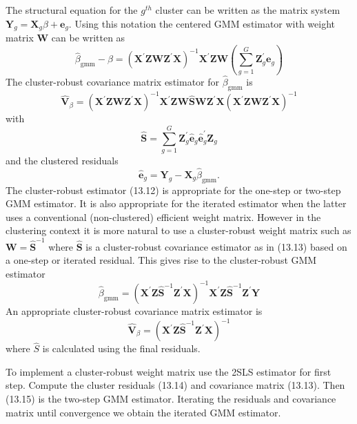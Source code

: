\documentclass[10pt]{article}
\begin{document}
The structural equation for the $g^{t h}$ cluster can be written as the matrix system $\boldsymbol{Y}_{g}=\boldsymbol{X}_{g} \beta+\boldsymbol{e}_{g}$. Using this notation the centered GMM estimator with weight matrix $\boldsymbol{W}$ can be written as
$$
\widehat{\beta}_{\mathrm{gmm}}-\beta=\left(\boldsymbol{X}^{\prime} \boldsymbol{Z} \boldsymbol{W} \boldsymbol{Z}^{\prime} \boldsymbol{X}\right)^{-1} \boldsymbol{X}^{\prime} \boldsymbol{Z} \boldsymbol{W}\left(\sum_{g=1}^{G} \boldsymbol{Z}_{g}^{\prime} \boldsymbol{e}_{g}\right)
$$
The cluster-robust covariance matrix estimator for $\widehat{\beta}_{\mathrm{gmm}}$ is
$$
\widehat{\boldsymbol{V}}_{\beta}=\left(\boldsymbol{X}^{\prime} \boldsymbol{Z} \boldsymbol{W} \boldsymbol{Z}^{\prime} \boldsymbol{X}\right)^{-1} \boldsymbol{X}^{\prime} \boldsymbol{Z} \boldsymbol{W} \widehat{\boldsymbol{S}} \boldsymbol{W} \boldsymbol{Z}^{\prime} \boldsymbol{X}\left(\boldsymbol{X}^{\prime} \boldsymbol{Z} \boldsymbol{W} \boldsymbol{Z}^{\prime} \boldsymbol{X}\right)^{-1}
$$
with
$$
\widehat{\boldsymbol{S}}=\sum_{g=1}^{G} \boldsymbol{Z}_{g}^{\prime} \widehat{\boldsymbol{e}}_{g} \widehat{\boldsymbol{e}}_{g}^{\prime} \boldsymbol{Z}_{g}
$$
and the clustered residuals
$$
\widehat{\boldsymbol{e}}_{g}=\boldsymbol{Y}_{g}-\boldsymbol{X}_{g} \widehat{\beta}_{\mathrm{gmm}} .
$$
The cluster-robust estimator (13.12) is appropriate for the one-step or two-step GMM estimator. It is also appropriate for the iterated estimator when the latter uses a conventional (non-clustered) efficient weight matrix. However in the clustering context it is more natural to use a cluster-robust weight matrix such as $\boldsymbol{W}=\widehat{\boldsymbol{S}}^{-1}$ where $\widehat{\boldsymbol{S}}$ is a cluster-robust covariance estimator as in (13.13) based on a one-step or iterated residual. This gives rise to the cluster-robust GMM estimator
$$
\widehat{\beta}_{\mathrm{gmm}}=\left(\boldsymbol{X}^{\prime} \boldsymbol{Z} \widehat{\boldsymbol{S}}^{-1} \boldsymbol{Z}^{\prime} \boldsymbol{X}\right)^{-1} \boldsymbol{X}^{\prime} \boldsymbol{Z} \widehat{\boldsymbol{S}}^{-1} \boldsymbol{Z}^{\prime} \boldsymbol{Y}
$$
An appropriate cluster-robust covariance matrix estimator is
$$
\widehat{\boldsymbol{V}}_{\beta}=\left(\boldsymbol{X}^{\prime} \boldsymbol{Z} \widehat{\boldsymbol{S}}^{-1} \boldsymbol{Z}^{\prime} \boldsymbol{X}\right)^{-1}
$$
where $\widehat{S}$ is calculated using the final residuals.

To implement a cluster-robust weight matrix use the 2SLS estimator for first step. Compute the cluster residuals (13.14) and covariance matrix (13.13). Then (13.15) is the two-step GMM estimator. Iterating the residuals and covariance matrix until convergence we obtain the iterated GMM estimator.
\end{document}
